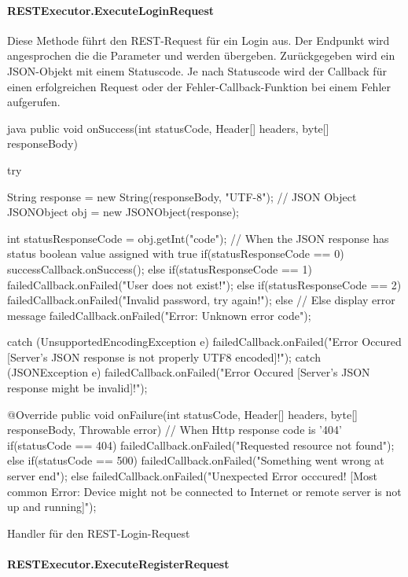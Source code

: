 \paragraph{RESTExecutor.ExecuteLoginRequest}
Diese Methode führt den REST-Request für ein Login aus. Der Endpunkt  wird angesprochen die die Parameter  und  werden übergeben. Zurückgegeben wird ein JSON-Objekt mit einem Statuscode. Je nach Statuscode wird der Callback für einen erfolgreichen Request oder der Fehler-Callback-Funktion bei einem Fehler aufgerufen.

\begin{listing}
\begin{code}{java}
public void onSuccess(int statusCode, Header[] headers, byte[] responseBody) {
	try {
		String response = new String(responseBody, "UTF-8");
		// JSON Object
		JSONObject obj = new JSONObject(response);
		
		int statusResponseCode = obj.getInt("code");
		// When the JSON response has status boolean value assigned with true
		if(statusResponseCode == 0) {
			successCallback.onSuccess();
		} else if(statusResponseCode == 1) {
			failedCallback.onFailed("User does not exist!");
		} else if(statusResponseCode == 2) {
			failedCallback.onFailed("Invalid password, try again!");
		} else { // Else display error message
		failedCallback.onFailed("Error: Unknown error code");
		}
	} catch (UnsupportedEncodingException e) {
		failedCallback.onFailed("Error Occured [Server's JSON response is not properly UTF8 encoded]!");
	} catch (JSONException e) {
		failedCallback.onFailed("Error Occured [Server's JSON response might be invalid]!");
	}
}

@Override
public void onFailure(int statusCode, Header[] headers, byte[] responseBody, Throwable error) {
	// When Http response code is '404'
	if(statusCode == 404){
		failedCallback.onFailed("Requested resource not found");
	} else if(statusCode == 500){
	failedCallback.onFailed("Something went wrong at server end");
	} else {
		failedCallback.onFailed("Unexpected Error occcured! [Most common Error: Device might not be 	connected to Internet or remote server is not up and running]");
	}
}

\end{code}
\caption{Handler für den REST-Login-Request}
\end{listing}

\paragraph{RESTExecutor.ExecuteRegisterRequest}



